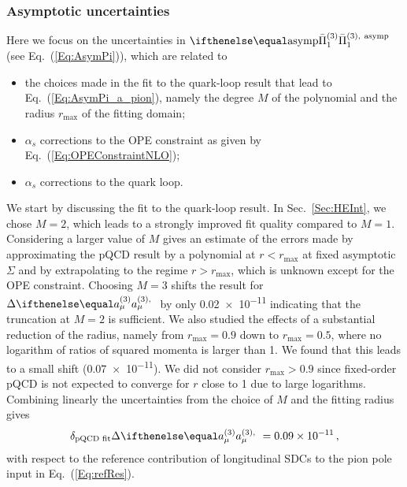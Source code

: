 \subsubsection{Asymptotic uncertainties}
\label{Sec:AsymUnc}
Here we focus on the uncertainties in $\Pipion[\text{asymp}]$ (see Eq.~(\ref{Eq:AsymPi})), which are related to
\begin{itemize}
	\item the choices made in the fit to the quark-loop result that lead to Eq.~(\ref{Eq:AsymPi_a_pion}), namely the degree $M$ of the polynomial and the radius $r_\text{max}$ of the fitting domain;
	\item $\alpha_s$ corrections to the OPE constraint as given by Eq.~(\ref{Eq:OPEConstraintNLO});
	\item $\alpha_s$ corrections to the quark loop. 
\end{itemize} 
We start by discussing the fit to the quark-loop result. In Sec.~\ref{Sec:HEInt}, we chose $M=2$, which leads to a strongly improved fit quality compared to $M=1$. Considering a larger value of $M$ gives an estimate of the errors made by approximating the pQCD result by a polynomial at $r < r_\text{max}$ at fixed asymptotic $\Sigma$ and by extrapolating to the regime $r>r_\text{max}$, which is unknown except for the OPE constraint. Choosing $M=3$ shifts the result for $\Delta \aPion$ by only \num{0.02e-11} indicating that the truncation at $M=2$ is sufficient. We also studied the effects of a substantial reduction of the radius, namely from $r_\text{max} = 0.9$ down to $r_\text{max} = 0.5$, where no logarithm of ratios of squared momenta is larger than 1. We found that this leads to a small shift (\num{0.07e-11}). We did not consider $r_\text{max}>0.9$ since fixed-order pQCD is not expected to converge for $r$ close to 1 due to large logarithms. Combining linearly the uncertainties from the choice of $M$ and the fitting radius gives 
\begin{equation}
\delta_\text{pQCD fit} \Delta \aPion = \num{0.09e-11}\,,
\end{equation}
with respect to the reference contribution of longitudinal SDCs to the pion pole input in Eq.~(\ref{Eq:refRes}).


